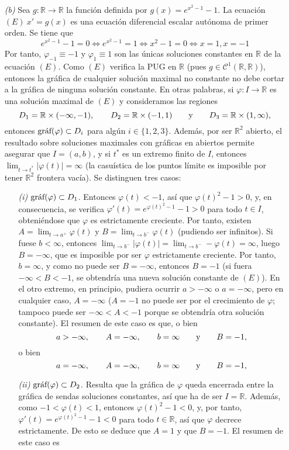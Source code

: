 \documentclass[11pt]{report}
\newcommand{\R}{\mathbb R}
\begin{document}
\begin{itemize}
\item[\textit{(b)}] Sea $g \colon \R \to \R$ la función definida por $g(x)=e^{x^2-1}-1$. La ecuación $(E) \ x'=g(x)$ es una ecuación diferencial escalar autónoma de primer orden. Se tiene que
\[e^{x^2-1}-1=0 \iff e^{x^2-1}=1 \iff x^2-1=0 \iff x=1,x=-1\]
Por tanto, $\varphi_{-1} \equiv -1$ y $\varphi_1\equiv 1$ son las únicas soluciones constantes en $\R$ de la ecuación $(E)$. Como $(E)$ verifica la PUG en $\R$ (pues $g \in \mathcal{C}^1(\R,\R)$), entonces la gráfica de cualquier solución maximal no constante no debe cortar a la gráfica de ninguna solución constante. En otras palabras, si $\varphi \colon I \to \R$ es una solución maximal de $(E)$ y consideramos las regiones
\[D_1= \R \times(-\infty,-1), \qquad D_2=\R \times (-1,1) \qquad \textup{y} \qquad D_3=\R \times (1,\infty),\]
entonces $\textup{gráf}(\varphi) \subset D_i$ para algún $i \in \{1,2,3\}$. Además, por ser $\R^2$ abierto, el resultado sobre soluciones maximales con gráficas en abiertos permite asegurar que $I=(a,b)$, y si $t^*$ es un extremo finito de $I$, entonces $\lim_{t \to t^*} |\varphi(t)|=\infty$ (la casuística de los puntos límite es imposible por tener $\R^2$ frontera vacía). Se distinguen tres casos:
\begin{itemize}
    \item[\textit{(i)}] $\textup{gráf}(\varphi) \subset D_1$. Entonces $\varphi(t)<-1$, así que $\varphi(t)^2-1>0$, y, en consecuencia, se verifica $\varphi'(t)=e^{\varphi(t)^2-1}-1>0$ para todo $t \in I$, obteniéndose que $\varphi$ es estrictamente creciente. Por tanto, existen $A=\lim_{t \to a^+}\varphi(t)$ y $B=\lim_{t \to b^{-}}\varphi(t)$ (pudiendo ser infinitos). Si fuese $b<\infty$, entonces $\lim_{t \to b^{-}} |\varphi(t)|=\lim_{t \to b^{-}} -\varphi(t)=\infty$, luego $B=-\infty$, que es imposible por ser $\varphi$ estrictamente creciente. Por tanto, $b=\infty$, y como no puede ser $B=-\infty$, entonces $B=-1$ (si fuera $-\infty<B<-1$, se obtendría una nueva solución constante de $(E)$). En el otro extremo, en principio, pudiera ocurrir $a>-\infty$ o $a=-\infty$, pero en cualquier caso, $A=-\infty$ ($A=-1$ no puede ser por el crecimiento de $\varphi$; tampoco puede ser $-\infty<A<-1$ porque se obtendría otra solución constante). El resumen de este caso es que, o bien
    \[a>-\infty, \qquad A=-\infty, \qquad b=\infty \qquad \textup{y} \qquad B=-1,\]
    o bien
    \[a=-\infty, \qquad A=-\infty, \qquad b=\infty \qquad \textup{y} \qquad B=-1,\]
    \item[\textit{(ii)}] $\textup{gráf}(\varphi) \subset D_2$. Resulta que la gráfica de $\varphi$ queda encerrada entre la gráfica de sendas soluciones constantes, así que ha de ser $I=\R$. Además, como $-1<\varphi(t)<1$, entonces $\varphi(t)^2-1 <0$, y, por tanto, $\varphi'(t)=e^{\varphi(t)^2-1}-1<0$ para todo $t \in \R$, así que $\varphi$ decrece estrictamente. De esto se deduce que $A=1$ y que $B=-1$. El resumen de este caso es

\end{itemize}
\end{itemize}
\end{document}
